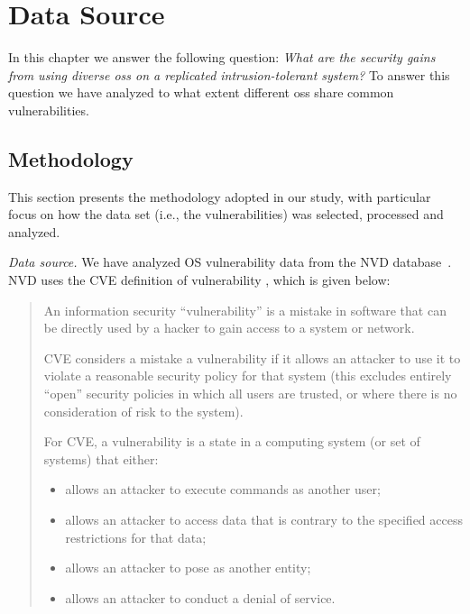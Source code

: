 \chapter{Data Source}
\label{chap:XXXX}

In this chapter we answer the following question: \emph{What are the security gains from using diverse \glspl{os} on a replicated intrusion-tolerant system?}
To answer this question we have analyzed to what extent different \glspl{os} share common vulnerabilities.
 

\section{Methodology}

This section presents the methodology adopted in our study, with particular focus on how the data set (i.e., the vulnerabilities) was selected, processed and analyzed.

\emph{Data source. }
We have analyzed OS vulnerability data from the NVD database~\cite{nvd}. NVD uses the CVE definition of vulnerability \cite{cveterminology}, which is given below:
\begin{quote}
  \begin{definition}
    An information security ``vulnerability'' is a mistake in software that can be directly used by a hacker to gain access to a system or network.

    CVE considers a mistake a vulnerability if it allows an attacker to use it to violate a reasonable security policy for that system (this excludes entirely ``open'' security policies in which all users are trusted, or where there is no consideration of risk to the system).

    For CVE, a vulnerability is a state in a computing system (or set of systems) that either:
    \begin{itemize}
    \item allows an attacker to execute commands as another user;
    \item allows an attacker to access data that is contrary to the specified access restrictions for that data;
    \item allows an attacker to pose as another entity;
    \item allows an attacker to conduct a denial of service.
    \end{itemize}
  \end{definition}
\end{quote}


